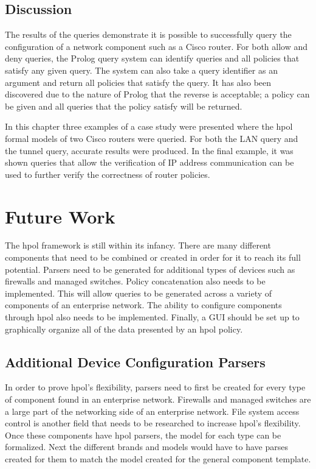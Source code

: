 \documentclass[12pt,letterpaper]{report}
\begin{document}
\section{Discussion}
The results of the queries demonstrate it is possible to successfully query the configuration of a network component such as a Cisco router. For both allow and deny queries, the Prolog query system can identify queries and all policies that satisfy any given query. The system can also take a query identifier as an argument and return all policies that satisfy the query. It has also been discovered due to the nature of Prolog that the reverse is acceptable; a policy can be given and all queries that the policy satisfy will be returned.

In this chapter three examples of a case study were presented where the \ac{hpol} formal models of two Cisco routers were queried. For both the LAN query and the tunnel query, accurate results were produced. In the final example, it was shown queries that allow the verification of IP address communication can be used to further verify the correctness of router policies.

\chapter{Future Work}
\label{Chapter:FutureWork}

The \ac{hpol} framework is still within its infancy. There are many different components that need to be combined or created in order for it to reach its full potential. Parsers need to be generated for additional types of devices such as firewalls and managed switches. Policy concatenation also needs to be implemented. This will allow queries to be generated across a variety of components of an enterprise network. The ability to configure components through \ac{hpol} also needs to be implemented. Finally, a GUI should be set up to graphically organize all of the data presented by an \ac{hpol} policy.

\section{Additional Device Configuration Parsers}
In order to prove \ac{hpol}'s flexibility, parsers need to first be created for every type of component found in an enterprise network. Firewalls and managed switches are a large part of the networking side of an enterprise network. File system access control is another field that needs to be researched to increase \ac{hpol}'s flexibility. Once these components have \ac{hpol} parsers, the model for each type can be formalized. Next the different brands and models would have to have parses created for them to match the model created for the general component template.
\end{document}
